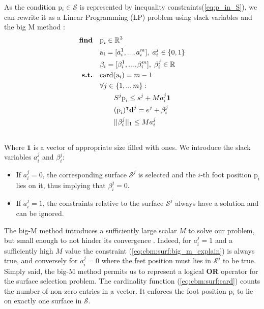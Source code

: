 As the condition p$_i \in \mathcal{S}$ is represented by inequality constraints(\ref{eq:p_in_S}), we can rewrite it as a Linear Programming (LP) problem using slack variables and the big M method \cite{big_M}:
\begin{align}
    \textrm{\textbf{find}}  \quad & \mbox{p}_i \in \mathbb{R}^3 \nonumber\\
                            \quad & \mbox{a}_i=[a_i^1,...,a_i^m], \; a_i^j \in \{0,1\} \nonumber\\
                            \quad & \beta_i=[\beta_i^1,...,\beta_i^m], \; \beta_i^j \in \mathbb{R} \nonumber\\
    \textrm{\textbf{s.t.}}  \quad & \mbox{card}(\mbox{a}_i) = m-1 \label{eq:cbm:surf:card}\\
                            \quad & \forall j \in \{1,..,m\} : \nonumber\\
                            \quad & \quad \quad S^j\mbox{p}_i \leq s^j + M a_i^j \textbf{1} \label{eq:cbm:surf:big_m_explain}\\
                            \quad & \quad \quad (\mbox{p}_i)^{\intercal} \textbf{d}^j = e^j + \beta_i^j \nonumber\\
                            \quad & \quad \quad ||\beta_i^j||_1 \leq M a_i^j \nonumber\\
                            \nonumber
\end{align}
Where $\textbf{1}$ is a vector of appropriate size filled with ones.
We introduce the slack variables $a_i^j$ and $\beta_i^j$:
\begin{itemize}
    \item If $a_i^j = 0$, the corresponding surface $\mathcal{S}^j$ is selected and the $i$-th foot position $\mbox{p}_i$ lies on it, thus implying that $\beta_i^j = 0$.
    \item If $a_i^j = 1$, the constraints relative to the surface $\mathcal{S}^j$ always have a solution and can be ignored.
\end{itemize}
The big-M method introduces a sufficiently large scalar $M$ to solve our problem, but small enough to not hinder its convergence \cite{big_M_danger}. 
Indeed, for $a_i^j = 1$ and a sufficiently high $M$ value the constraint (\ref{eq:cbm:surf:big_m_explain}) is always true, and conversely for $a_i^j = 0$ where the feet position must lies in $\mathcal{S}^j$ to be true.
Simply said, the big-M method permits us to represent a logical \textbf{OR} operator for the surface selection problem.
The cardinality function (\ref{eq:cbm:surf:card}) counts the number of non-zero entries in a vector. 
It enforces the foot position p$_i$ to lie on exactly one surface in $\mathcal{S}$.


